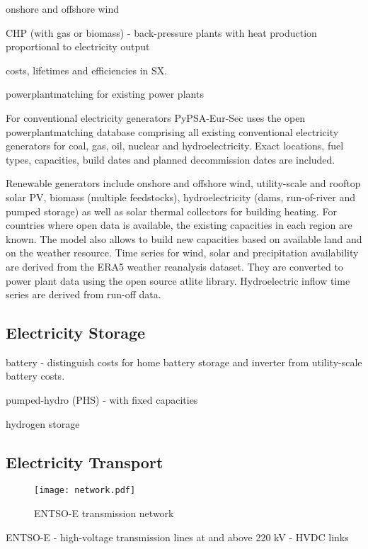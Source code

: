 onshore and offshore wind

CHP (with gas or biomass)
- back-pressure plants with heat production proportional to electricity output

costs, lifetimes and efficiencies in SX.

powerplantmatching for existing power plants 

For conventional electricity generators PyPSA-Eur-Sec uses the open
powerplantmatching database comprising all existing conventional electricity
generators for coal, gas, oil, nuclear and hydroelectricity. Exact locations,
fuel types, capacities, build dates and planned decommission dates are included.

Renewable generators include onshore and offshore wind, utility-scale and
rooftop solar PV, biomass (multiple feedstocks), hydroelectricity (dams,
run-of-river and pumped storage) as well as solar thermal collectors for
building heating. For countries where open data is available, the existing
capacities in each region are known. The model also allows to build new
capacities based on available land and on the weather resource. Time series for
wind, solar and precipitation availability are derived from the ERA5 weather
reanalysis dataset. They are converted to power plant data using the open source
atlite library. Hydroelectric inflow time series are derived from run-off data.

\subsection{Electricity Storage}

battery
- distinguish costs for home battery storage and inverter from utility-scale battery costs.

pumped-hydro (PHS)
- with fixed capacities

hydrogen storage

\subsection{Electricity Transport}

\begin{figure}
    \texttt{[image: network.pdf]}
    \label{fig:network}
    \caption{ENTSO-E transmission network}
\end{figure}

ENTSO-E
- high-voltage transmission lines at and above 220 kV
- HVDC links


